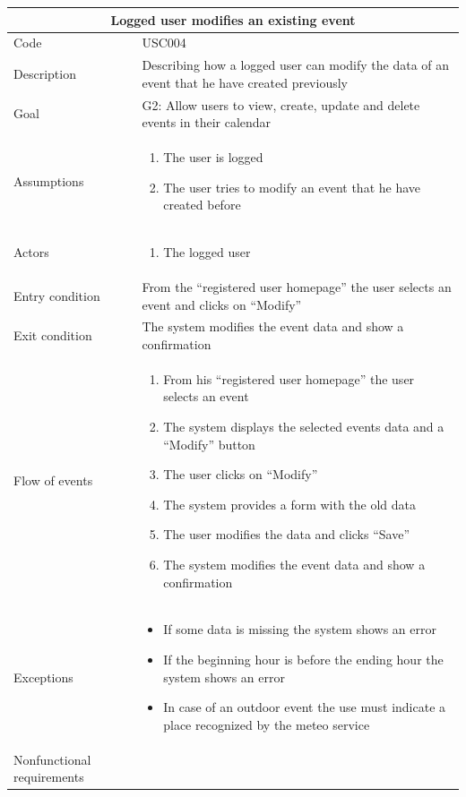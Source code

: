 \documentclass[10pt,a4paper,titlepage]{article}
\begin{document}
\begin{tabular}[h]{| p{3cm} | p{10cm} |}
\hline \multicolumn{2}{|c|}{\textbf{Logged user modifies an existing event}} \\ 
\hline Code & USC004 \\ 
\hline Description & Describing how a logged user can modify the data of an event that he have created previously \\
\hline Goal & G2: Allow users to view, create, update and delete events in their calendar\\
\hline Assumptions  & \begin{enumerate}
\item The user is logged
\item The user tries to modify an event that he have created before
\end{enumerate} \\
\hline Actors &  \begin{enumerate}
\item The logged user
\end{enumerate} \\
\hline Entry condition & From the “registered user homepage” the user selects an event and clicks on “Modify” \\
\hline Exit condition & The system modifies the event data and show a confirmation \\
\hline Flow of events & \begin{enumerate}
\item From his “registered user homepage” the user selects an event
\item The system displays the selected events data and a “Modify” button
\item The user clicks on “Modify”
\item The system provides a form with the old data
\item The user modifies the data and clicks “Save”
\item The system modifies the event data and show a confirmation
\end{enumerate}\\
\hline Exceptions &\begin{itemize}
\item If some data is missing the system shows an error
\item  If the beginning hour is before the ending hour the system shows an error
\item In case of an outdoor event the use must indicate a place recognized by the meteo service
\end{itemize} \\
\hline Nonfunctional requirements &  \\
\hline
\end{tabular}
\end{document}
